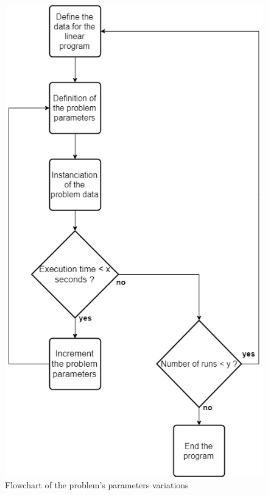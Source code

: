 \documentclass[12pt, a4paper, twoside]{memoir}
\begin{document}
{	\begin{figure}[H]
		\centering
		\begin{flushleft}
			\includegraphics[scale=0.4]{img/i_flowchartpbvariation.png}
		\end{flushleft}
		\caption{Flowchart of the problem's parameters variations}
		\label{fig:Flowchart of the problem's parameters variations}
	\end{figure}
	
}
\end{document}
